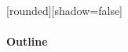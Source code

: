 {
  [rounded][shadow=false]
  \begin{frame}[plain]
  \end{frame}
}

% 
% 
% 
% 
% 
% 
% 
%     


\placelogotrue
\begin{frame}
  \framesubtitle{Outline}
  \begin{columns}[c]
    \begin{column}{0.5\textwidth}
      \tableofcontents[sections={1-2}]
    \end{column}
    \begin{column}{0.5\textwidth}
      \tableofcontents[sections={3-4}]
    \end{column}
  \end{columns}
\end{frame}
\placelogofalse
